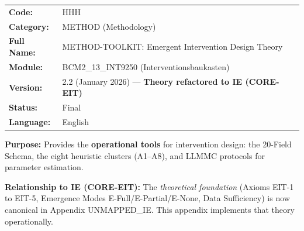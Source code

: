 %
%
%
%


\begin{tcolorbox}[colback=gray!5!white, colframe=gray!75!black,
    title=Appendix Header: HHH METHOD-TOOLKIT]

\begin{tabular}{@{}ll@{}}
\textbf{Code:} & HHH \\
\textbf{Category:} & METHOD (Methodology) \\
\textbf{Full Name:} & METHOD-TOOLKIT: Emergent Intervention Design Theory \\
\textbf{Module:} & BCM2\_13\_INT9250 (Interventionsbaukasten) \\
\textbf{Version:} & 2.2 (January 2026) --- \textbf{Theory refactored to IE (CORE-EIT)} \\
\textbf{Status:} & Final \\
\textbf{Language:} & English \\
\end{tabular}

\vspace{0.5em}
\textbf{Purpose:} Provides the \textbf{operational tools} for intervention design:
the 20-Field Schema, the eight heuristic clusters (A1--A8), and LLMMC protocols
for parameter estimation.

\textbf{Relationship to IE (CORE-EIT):} The \textit{theoretical foundation} (Axioms EIT-1 to EIT-5,
Emergence Modes E-Full/E-Partial/E-None, Data Sufficiency) is now canonical in Appendix UNMAPPED_IE.
This appendix implements that theory operationally.

\end{tcolorbox}

